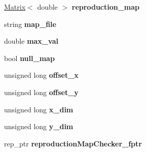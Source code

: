 \begin{DoxyCompactItemize}
\item 
\hyperlink{class_matrix}{Matrix}$<$ double $>$ {\bfseries reproduction\+\_\+map}\hypertarget{class_reproduction_map_a4092819111e3b20c8c6bbd189a81def7}{}\label{class_reproduction_map_a4092819111e3b20c8c6bbd189a81def7}

\item 
string {\bfseries map\+\_\+file}\hypertarget{class_reproduction_map_a4fdefab63d92f1244422b602ef11b2ee}{}\label{class_reproduction_map_a4fdefab63d92f1244422b602ef11b2ee}

\item 
double {\bfseries max\+\_\+val}\hypertarget{class_reproduction_map_a093ebaad740e4d8b0873bb6e96e5e1c1}{}\label{class_reproduction_map_a093ebaad740e4d8b0873bb6e96e5e1c1}

\item 
bool {\bfseries null\+\_\+map}\hypertarget{class_reproduction_map_a3ae593187d7087cb543f40fe59218257}{}\label{class_reproduction_map_a3ae593187d7087cb543f40fe59218257}

\item 
unsigned long {\bfseries offset\+\_\+x}\hypertarget{class_reproduction_map_acaa2a99d3667440a1e610fd1d0ecda7e}{}\label{class_reproduction_map_acaa2a99d3667440a1e610fd1d0ecda7e}

\item 
unsigned long {\bfseries offset\+\_\+y}\hypertarget{class_reproduction_map_ae70ca7adb1272ed2a15287108526351b}{}\label{class_reproduction_map_ae70ca7adb1272ed2a15287108526351b}

\item 
unsigned long {\bfseries x\+\_\+dim}\hypertarget{class_reproduction_map_aea934c598f314851c50a9d5aa12f8035}{}\label{class_reproduction_map_aea934c598f314851c50a9d5aa12f8035}

\item 
unsigned long {\bfseries y\+\_\+dim}\hypertarget{class_reproduction_map_a48dcb8efff54b3734d2a560f6660dc18}{}\label{class_reproduction_map_a48dcb8efff54b3734d2a560f6660dc18}

\item 
rep\+\_\+ptr {\bfseries reproduction\+Map\+Checker\+\_\+fptr}\hypertarget{class_reproduction_map_a927b35c48a2c3c32a994a95ebfb9aa87}{}\label{class_reproduction_map_a927b35c48a2c3c32a994a95ebfb9aa87}

\end{DoxyCompactItemize}
